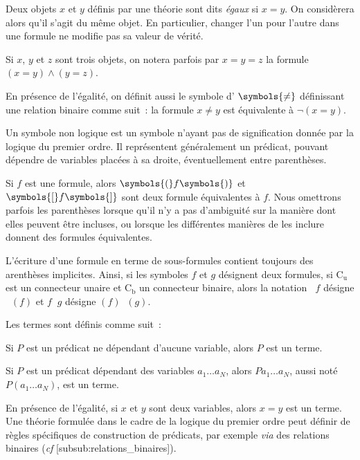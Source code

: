 Deux objets $x$ et $y$ définis par une théorie sont dits \emph{égaux} si $x = y$. 
On considèrera alors qu'il s'agit du même objet. 
En particulier, changer l'un pour l'autre dans une formule ne modifie pas sa valeur de vérité.

Si $x$, $y$ et $z$ sont trois objets, on notera parfois par $x = y = z$ la formule $(x = y) \wedge (y = z)$. 

En présence de l'égalité, on définit aussi le symbole d'\emph{} $\symbols{\neq}$ définissant une relation binaire comme suit : la formule $x \neq y$ est équivalente à $\lnot (x = y)$.

\stopsubsection


\startsubsection[title=Symboles non logiques]

Un symbole non logique est un symbole n'ayant pas de signification donnée par la logique du premier ordre. 
Il représentent généralement un prédicat, pouvant dépendre de variables placées à sa droite, éventuellement entre parenthèses.

\stopsubsection


\startsubsection[title={Parenthèses, symboles $($, $)$, $[$, $]$}]

Si $f$ est une formule, alors $\symbols{(}f\symbols{)}$ et $\symbols{[}f\symbols{]}$ sont deux formule équivalentes à $f$. 
Nous omettrons parfois les parenthèses lorsque qu'il n'y a pas d'ambiguité sur la manière dont elles peuvent être incluses, ou lorsque les différentes manières de les inclure donnent des formules équivalentes. 

L'écriture d'une formule en terme de sous-formules contient toujours des arenthèses implicites. 
Ainsi, si les symboles $f$ et $g$ désignent deux formules, si $\mathrm{C_u}$ est un connecteur unaire et $\mathrm{C_b}$ un connecteur binaire, alors la notation $\mathop{\mathrm{C_u}} f$ désigne $\mathop{\mathrm{C_u}} (f)$ et $f \mathop{\mathrm{C_b}} g$ désigne $(f) \mathop{\mathrm{C_b}} (g)$.

\stopsubsection


\startsubsection[title=Termes]

Les termes sont définis comme suit : 
\startitemize
  \item Si $P$ est un prédicat ne dépendant d'aucune variable, alors $P$ est un terme.
  \item Si $P$ est un prédicat dépendant des variables $a_1 \dots a_N$, alors $P a_1 \dots a_N$, aussi noté $P (a_1 \dots a_N)$, est un terme. 
  \item En présence de l'égalité, si $x$ et $y$ sont deux variables, alors $x = y$ est un terme.
\stopitemize
Une théorie formulée dans le cadre de la logique du premier ordre peut définir de règles spécifiques de construction de prédicats, par exemple \emph{via} des relations binaires (\emph{cf} [subsub:relations_binaires]).


